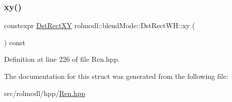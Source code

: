 \subsubsection{\texorpdfstring{xy()}{xy()}}
{\footnotesize\ttfamily constexpr \mbox{\hyperlink{structrolmodl_1_1blend_mode_1_1_dst_rect_x_y}{Dst\+Rect\+XY}} rolmodl\+::blend\+Mode\+::\+Dst\+Rect\+W\+H\+::xy (\begin{DoxyParamCaption}{ }\end{DoxyParamCaption}) const\hspace{0.3cm}{\ttfamily [noexcept]}}



Definition at line 226 of file Ren.\+hpp.



The documentation for this struct was generated from the following file\+:\begin{DoxyCompactItemize}
\item 
src/rolmodl/hpp/\mbox{\hyperlink{_ren_8hpp}{Ren.\+hpp}}\end{DoxyCompactItemize}
